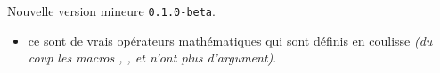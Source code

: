 Nouvelle version mineure \verb+0.1.0-beta+.

\begin{itemize}[itemsep=.5em]
    \item {}
          ce sont de vrais opérateurs mathématiques qui sont définis en coulisse \emph{(du coup les macros , ,  et  n'ont plus d'argument)}.   
\end{itemize}

\separation

